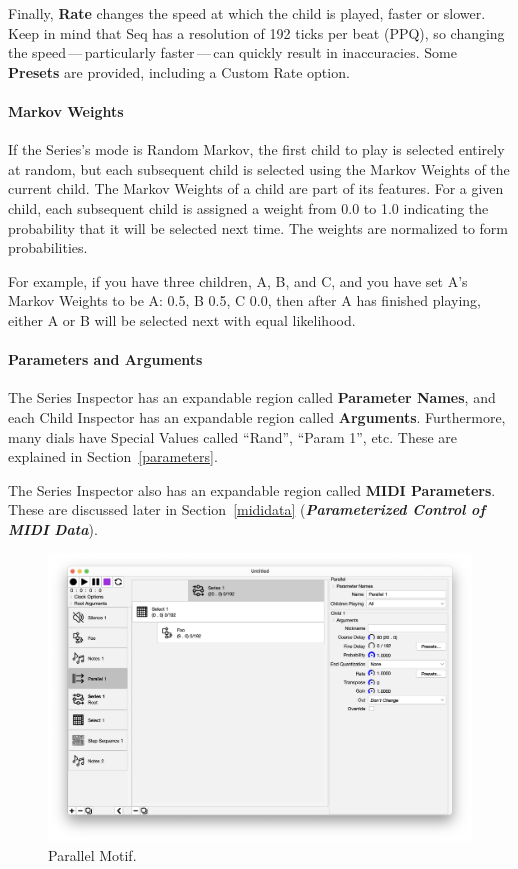 \documentclass[twoside,10pt]{article}
\begin{document}
Finally, {\bf Rate} changes the speed at which the child is played, faster or slower.  Keep in mind that Seq has a resolution of 192 ticks per beat (PPQ), so changing the speed\,---\,particularly faster\,---\,can quickly result in inaccuracies.  Some {\bf Presets} are provided, including a Custom Rate option.

\paragraph{Markov Weights}

If the Series's mode is Random Markov, the first child to play is selected entirely at random, but each subsequent child is selected using the Markov Weights of the current child.  The Markov Weights of a child are part of its features.  For a given child, each subsequent child is assigned a weight from 0.0 to 1.0 indicating the probability that it will be selected next time.  The weights are normalized to form probabilities.

For example, if you have three children, A, B, and C, and you have set A's Markov Weights to be A: 0.5, B 0.5, C 0.0, then after A has finished playing, either A or B will be selected next with equal likelihood.

\paragraph{Parameters and Arguments}

The Series Inspector has an expandable region called {\bf Parameter Names}, and each Child Inspector has an expandable region called {\bf Arguments}. Furthermore, many dials have Special Values called ``Rand'', ``Param 1'', etc.  These are explained in Section~\ref{parameters}.

The Series Inspector also has an expandable region called {\bf MIDI Parameters}.  These are discussed later in Section~\ref{mididata} (\textbf{\textit{Parameterized Control of MIDI Data}}).

\clearpage

\begin{figure}[t]
\centering
\includegraphics[width=6.5in]{Parallel}
\vspace{-2em}
\caption{Parallel Motif.}
\label{parallel}
\end{figure}
\end{document}
